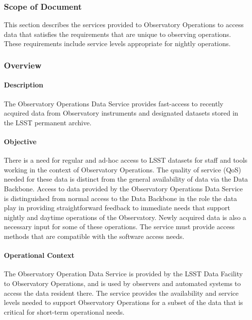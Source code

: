 ﻿\subsubsection{Scope of Document}
This section describes the services provided to Observatory 
Operations to access data that satisfies the requirements that 
are unique to observing operations. These requirements include 
service levels appropriate for nightly operations. 

\subsubsection{Overview}

\paragraph{Description}

The Observatory Operations Data Service provides fast-access to 
recently acquired data from Observatory instruments and designated 
datasets stored in the LSST permanent archive.

\paragraph{Objective}

There is a need for regular and ad-hoc access to LSST datasets for
staff and tools working in the context of Observatory Operations. The 
quality of service (QoS) needed for these data is distinct from the general 
availability of data via the Data Backbone. Access to data provided by the 
Observatory Operations Data Service is distinguished from normal access 
to the Data Backbone in the role the data play in providing straightforward 
feedback to immediate needs that support nightly and daytime operations of 
the Observatory. Newly acquired data is also a necessary input for some of
these operations. The service must provide access methods that are compatible 
with the software access needs.

\paragraph{Operational Context}

The Observatory Operation Data Service is provided by the LSST Data
Facility to Observatory Operations, and is used by observers and
automated systems to access the data resident there. The service
provides the availability and service levels needed to support
Observatory Operations for a subset of the data that is critical for
short-term operational needs.

